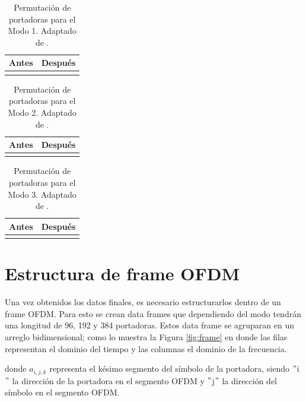 	\begin{table}[H]
		\centering
		\begin{tabular}{|c c|}
			\hline
			Antes & Después \\\hline\hline
			&\\\hline
		\end{tabular}
		\caption{Permutación de portadoras para el Modo 1. Adaptado de \cite{isdbt}.}
		\label{tab:perm_m1}
	\end{table}

	\begin{table}[H]
		\centering
		\begin{tabular}{|c c|}
			\hline
			Antes & Después \\\hline\hline
			&\\\hline

		\end{tabular}
		\caption{Permutación de portadoras para el Modo 2. Adaptado de \cite{isdbt}.}
		\label{tab:perm_m2}
	\end{table}

	\begin{table}[H]
		\centering
		\begin{tabular}{|c c|}
			\hline
			Antes & Después \\\hline\hline

			&\\\hline
		\end{tabular}
		\caption{Permutación de portadoras para el Modo 3. Adaptado de \cite{isdbt}.}
		\label{tab:perm_m3}
	\end{table}



	\section{Estructura de frame OFDM}
	Una vez obtenidos los datos finales, es necesario estructurarlos dentro de un frame OFDM. Para esto se crean data frames que dependiendo del modo tendrán una longitud de 96, 192 y 384 portadoras. Estos data frame se agruparan en un arreglo bidimensional; como lo muestra la Figura \ref{fig:frame} en donde las filas representan el dominio del tiempo y las columnas el dominio de la frecuencia.


	donde $a_{i,j,k}$ representa el késimo segmento del símbolo de la portadora, siendo $"$i$"$ la dirección de la portadora en el segmento OFDM y $"$j$"$ la dirección del símbolo en el segmento OFDM.


